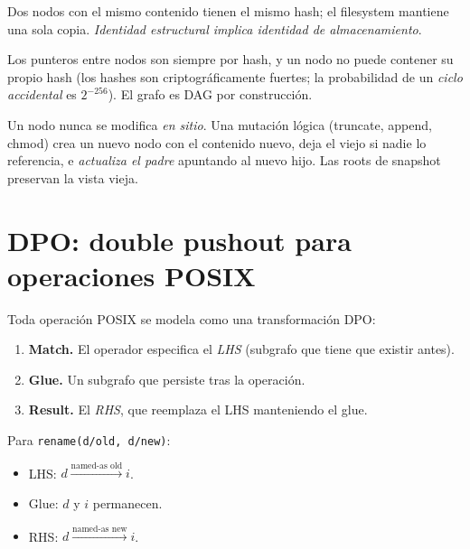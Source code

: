 \begin{invariante}
\label{inv:sotfs-identity}
Dos nodos con el mismo contenido tienen el mismo hash; el
filesystem mantiene una sola copia. \emph{Identidad estructural
implica identidad de almacenamiento}.
\end{invariante}

\begin{invariante}[Acíclico]
\label{inv:sotfs-acyclic}
Los punteros entre nodos son siempre por hash, y un nodo no
puede contener su propio hash (los hashes son criptográficamente
fuertes; la probabilidad de un \emph{ciclo accidental} es
$2^{-256}$). El grafo es DAG por construcción.
\end{invariante}

\begin{invariante}
\label{inv:sotfs-immutable}
Un nodo nunca se modifica \emph{en sitio}. Una mutación lógica
(truncate, append, chmod) crea un nuevo nodo con el contenido
nuevo, deja el viejo si nadie lo referencia, e \emph{actualiza
el padre} apuntando al nuevo hijo. Las roots de snapshot
preservan la vista vieja.
\end{invariante}

\section{DPO: double pushout para operaciones POSIX}

Toda operación POSIX se modela como una transformación DPO:

\begin{enumerate}
  \item \textbf{Match.} El operador especifica el \emph{LHS}
    (subgrafo que tiene que existir antes).
  \item \textbf{Glue.} Un subgrafo que persiste tras la
    operación.
  \item \textbf{Result.} El \emph{RHS}, que reemplaza el LHS
    manteniendo el glue.
\end{enumerate}

Para \texttt{rename(d/old, d/new)}:

\begin{itemize}
  \item LHS: $d \xrightarrow{\text{named-as old}} i$.
  \item Glue: $d$ y $i$ permanecen.
  \item RHS: $d \xrightarrow{\text{named-as new}} i$.
\end{itemize}

